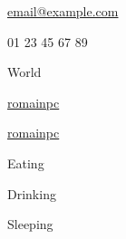 \documentclass[11pt]{spidercv}
\begin{document}
\begin{TopBar}{\ColorTextSide}

    \begin{DoubleColumns}
        \begin{ItemList}{\ColorHighlight}
            \item [\Large\faAt] \href{mailto:email@example.com}{email@example.com}
            \item [\Large\faMobile] 01 23 45 67 89
            \item [\Large\faMapMarker] World
        \end{ItemList}
        \nextcolumn
        \begin{ItemList}{\ColorHighlight}
            \item [\Large\faGithub] \href{https://github.com/romainpc}{romainpc}
            \item [\Large\faLinkedinSquare] \href{https://www.linkedin.com/}{romainpc}
        \end{ItemList}
    \end{DoubleColumns}

    \begin{TripleColumns}
        \begin{ItemList}{\ColorHighlight}
            \item [] Eating
        \end{ItemList}
        \nextcolumn
        \begin{ItemList}{\ColorHighlight}
            \item [] Drinking
        \end{ItemList}
        \nextcolumn
        \begin{ItemList}{\ColorHighlight}
            \item [] Sleeping
        \end{ItemList}
    \end{TripleColumns}
\end{TopBar}
\end{document}
